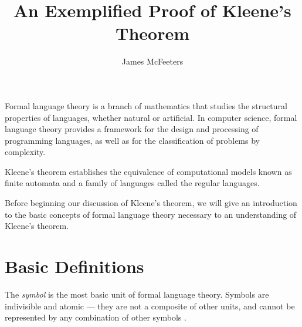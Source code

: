 \documentclass{bcthesis}
\title{An Exemplified Proof of Kleene's Theorem}
\author{James McFeeters}
\newif\ifbuildfrontmatter
\newcommand{\footcite}[2]{\xspace\cite[pg.~{#2}]{#1}\xspace}
\begin{document}
\ifbuildfrontmatter
\frontmatter

	\maketitle

	\begin{abstract}
		This paper offers a proof of Kleene's theorem, accompanied by the necessary background in formal language theory, as well as detailed examples illustrating key points. 
		There is also a brief discussion of the importance and application of Kleene's theorem in practice.		
	\end{abstract}


	\begin{acknowledgments}
		I thank Darrah Chavey for his capable advising and for introducing me to the topic.
		I thank Cameron Kuchta for proofreading my paper, and Simon Tomlinson for proofreading my paper and assisting me in writing the program used to produce examples.
	\end{acknowledgments}

	\tableofcontents
	\clearpage
\fi

\mainmatter
{}
\label{ch:basics}

	Formal language theory is a branch of mathematics that studies the structural properties of languages, whether natural or artificial.
	In computer science, formal language theory provides a framework for the design and processing of programming languages, as well as for the classification of problems by complexity.

	Kleene's theorem establishes the equivalence of computational models known as finite automata and a family of languages called the regular languages.

	Before beginning our discussion of Kleene's theorem, we will give an introduction to the basic concepts of formal language theory necessary to an understanding of Kleene's theorem.

	\section{Basic Definitions} %
	\label{sec:basic_definitions}
		\begin{definition}[Symbol]
			The \textit{symbol} is the most basic unit of formal language theory.
			Symbols are indivisible and atomic --- they are not a composite of other units, and cannot be represented by any combination of other symbols \footcite{hopcroft}{1}.
		\end{definition}
\end{document}
